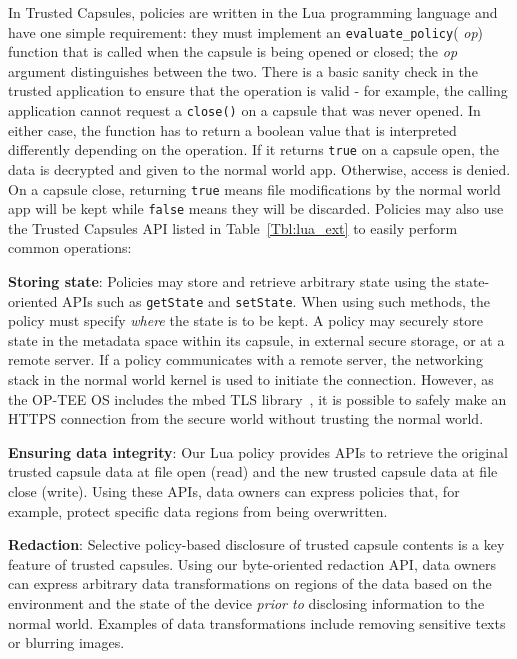 In Trusted Capsules, policies are written in the Lua programming language and
have one simple requirement: they must implement an {\tt evaluate\_policy}({\em
        op}) function that is called when the capsule is being opened or closed; the
    {\em op} argument distinguishes between the two. There is a basic sanity check in the trusted application to ensure that the operation is valid - for example, the calling application cannot request a \texttt{close()} on a capsule that was never opened. In either case, the function
has to return a boolean value that is interpreted differently depending on the
operation. If it returns {\tt true} on a capsule open, the data is decrypted and
given to the normal world app. Otherwise, access is denied. On a capsule close,
returning {\tt true} means file modifications by the normal world app will be
kept while {\tt false} means they will be discarded. Policies may also use the
Trusted Capsules API listed in Table~\ref{Tbl:lua_ext} to easily perform common
operations:

\textbf{Storing state}: Policies may store and retrieve arbitrary state using
the state-oriented APIs such as {\tt getState} and {\tt setState}. When using
such methods, the policy must specify {\em where}
the state is to be kept. A policy may securely store state in the metadata space within
its capsule, in external secure storage, or at a remote server. If a policy
communicates with a remote server, the networking stack in the normal world
kernel is used to initiate the connection. However, as the OP-TEE OS includes
the mbed TLS library~\cite{mbed}, it is possible to safely make an HTTPS
connection from the secure world without trusting the normal world.

\textbf{Ensuring data integrity}: Our Lua policy provides APIs to retrieve the
original trusted capsule data at file open (read) and the new trusted capsule
data at file close (write). Using these APIs, data owners can express
policies that, for example, protect specific data regions from being
overwritten. %

\textbf{Redaction}: Selective policy-based disclosure of trusted capsule
contents is a key feature of trusted capsules. Using our byte-oriented
redaction API, data owners can express arbitrary data
transformations on regions of the data based on the environment and
the state of the device \emph{prior to} disclosing information to the normal world.  Examples
of data transformations include removing sensitive texts or blurring
images. %

